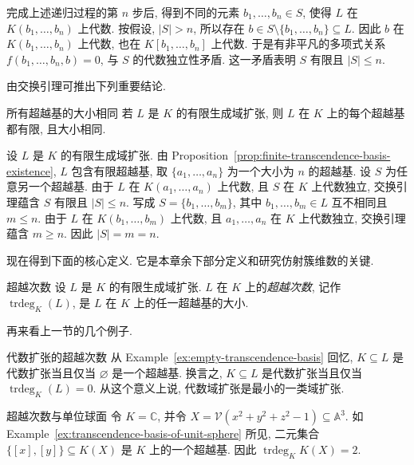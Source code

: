 \begin{Proof}
完成上述递归过程的第 $n$ 步后, 得到不同的元素 $b_{1},\ldots,b_{n}\in S$, 使得 $L$ 在 $K(b_{1},\ldots,b_{n})$ 上代数. 按假设, $|S|>n$, 所以存在 $b\in S\setminus\{b_{1},\ldots,b_{n}\}\subseteq L$. 因此 $b$ 在 $K(b_{1},\ldots,b_{n})$ 上代数, 也在 $K[b_{1},\ldots,b_{n}]$ 上代数. 于是有非平凡的多项式关系 $f(b_{1},\ldots,b_{n},b)=0$, 与 $S$ 的代数独立性矛盾. 这一矛盾表明 $S$ 有限且 $|S|\leq n$.
\end{Proof}

由交换引理可推出下列重要结论.

\begin{Proposition}{所有超越基的大小相同}\leavevmode\label{prop:transcendence-bases-equal-size}
若 $L$ 是 $K$ 的有限生成域扩张, 则 $L$ 在 $K$ 上的每个超越基都有限, 且大小相同.
\end{Proposition}
\begin{Proof}
设 $L$ 是 $K$ 的有限生成域扩张. 由 Proposition~\ref{prop:finite-transcendence-basis-existence}, $L$ 包含有限超越基, 取 $\{a_{1},\ldots,a_{n}\}$ 为一个大小为 $n$ 的超越基. 设 $S$ 为任意另一个超越基. 由于 $L$ 在 $K(a_{1},\ldots,a_{n})$ 上代数, 且 $S$ 在 $K$ 上代数独立, 交换引理蕴含 $S$ 有限且 $|S|\leq n$. 写成 $S=\{b_{1},\ldots,b_{m}\}$, 其中 $b_{1},\ldots,b_{m}\in L$ 互不相同且 $m\leq n$. 由于 $L$ 在 $K(b_{1},\ldots,b_{m})$ 上代数, 且 $a_{1},\ldots,a_{n}$ 在 $K$ 上代数独立, 交换引理蕴含 $m\geq n$. 因此 $|S|=m=n$.
\end{Proof}

现在得到下面的核心定义. 它是本章余下部分定义和研究仿射簇维数的关键.

\begin{Definition}{超越次数}\leavevmode\label{def:transcendence-degree}
设 $L$ 是 $K$ 的有限生成域扩张. $L$ 在 $K$ 上的\emph{超越次数}, 记作 $\operatorname{trdeg}_{K}(L)$, 是 $L$ 在 $K$ 上的任一超越基的大小.
\end{Definition}

再来看上一节的几个例子.

\begin{Example}{代数扩张的超越次数}\leavevmode\label{ex:transcendence-degree-of-algebraic-extensions}
从 Example~\ref{ex:empty-transcendence-basis} 回忆, $K\subseteq L$ 是代数扩张当且仅当 $\varnothing$ 是一个超越基. 换言之, $K\subseteq L$ 是代数扩张当且仅当 $\operatorname{trdeg}_{K}(L)=0$. 从这个意义上说, 代数域扩张是最小的一类域扩张.
\end{Example}

\begin{Example}{超越次数与单位球面}\leavevmode\label{ex:transcendence-degree-of-unit-sphere}
令 $K=\mathbb{C}$, 并令 $X=\mathcal{V}(x^{2}+y^{2}+z^{2}-1)\subseteq\mathbb{A}^{3}$. 如 Example~\ref{ex:transcendence-basis-of-unit-sphere} 所见, 二元集合 $\{[x],[y]\}\subseteq K(X)$ 是 $K$ 上的一个超越基. 因此 $\operatorname{trdeg}_{K}K(X)=2$.
\end{Example}

